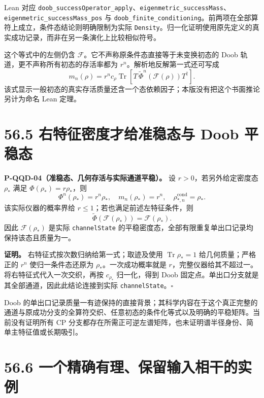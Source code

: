 \documentclass[
  11pt,
  oneside]{book}
\begin{document}
Lean 对应
\texttt{doob\_\allowbreak success\allowbreak Operator\_\allowbreak apply}、\allowbreak \texttt{eigenmetric\_\allowbreak success\allowbreak Mass}、\allowbreak \texttt{eigenmetric\_\allowbreak success\allowbreak Mass\_\allowbreak pos}
与
\texttt{doob\_\allowbreak finite\_\allowbreak conditioning}。前两项在全部算符上成立，条件态结论则明确限制为实际
\texttt{Density}。归一化证明使用原先定义的真实成功记录，而非在另一条演化上比较相似符号。

这个等式中的左侧仍含
\(\mathcal F\)。它不声称原条件态直接等于未变换初态的 Doob
轨道，更不声称所有初态的存活率都为 \(r^n\)。解析地反解第一式还可写成 \[
m_n(\rho)=r^nc_\rho\operatorname{Tr}\!\left[
T\,\widetilde\Phi^n(\mathcal F(\rho))T^\dagger\right].
\]
该式显示一般初态的真实存活质量还含一个态依赖因子；本版没有把这个书面推论另计为命名
Lean 定理。

\section{56.5 右特征密度才给准稳态与 Doob 平稳态}

\protect\hypertarget{p-qqd-04}{}{}

\textbf{P-QQD-04（准稳态、几何存活与实际通道平稳）。} 设
\(r>0\)，若另外给定密度态 \(\rho_*\) 满足 \(\Phi(\rho_*)=r\rho_*\)，则
\[
\Phi^n(\rho_*)=r^n\rho_*,\quad m_n(\rho_*)=r^n,
\quad \rho_{*,n}^{\mathrm{cond}}=\rho_*.
\] 该实际仪器的概率界给 \(r\le1\)；若也满足前述左特征条件，则 \[
\widetilde\Phi(\mathcal F(\rho_*))=\mathcal F(\rho_*).
\] 因此 \(\mathcal F(\rho_*)\) 是实际 \texttt{channel\allowbreak State}
的平稳密度态，全部有限重复单出口记录均保持该态且质量为一。

\textbf{证明。} 右特征式按次数归纳给第一式；取迹及使用
\(\operatorname{Tr}\rho_*=1\) 给几何质量；严格正的 \(r^n\)
使归一条件态还原为 \(\rho_*\)。一次成功概率就是
\(r\)，完整仪器给其不超过一。将右特征式代入一次交织，再按 \(c_{\rho_*}\)
归一化，得到 Doob 固定点。单出口分支就是其全部通道，因此此结论连接到实际
\texttt{channel\allowbreak State}。\(\square\)

Doob
的单出口记录质量一有迹保持的直接背景；其科学内容在于这个真正完整的通道与原成功分支的全算符交织、任意初态的条件化等式以及明确的平稳矩阵。当前没有证明所有
CP
分支都存在所需正可逆左谱矩阵，也未证明谱半径身份、简单主特征值或长期吸引。

\section{56.6 一个精确有理、保留输入相干的实例}
\end{document}
